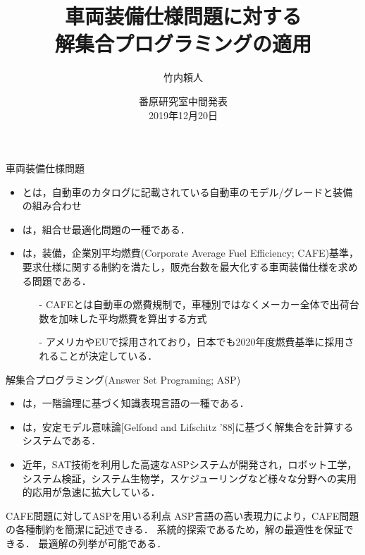 \documentclass[dvipdfmx, 11pt]{beamer}
\title{車両装備仕様問題に対する\\解集合プログラミングの適用}
\author{竹内頼人}
\institute{名古屋大学 工学部 電気電子・情報工学科 情報工学コース 4年}
\date{番原研究室中間発表\\2019年12月20日}
\begin{document}
\begin{frame} {}
 \titlepage
\end{frame}
\begin{frame}{車両装備仕様問題}
 \begin{itemize}
 \setlength{\itemsep}{10pt}
  \item {}とは，自動車のカタログに記載されている自動車のモデル/グレードと装備の組み合わせ
 
  \item {}は，組合せ最適化問題の一種である．

   \item {}は，装備，企業別平均燃費(Corporate Average Fuel Efficiency; CAFE)基準，
      要求仕様に関する制約を満たし，販売台数を最大化する車両装備仕様を求める問題である．
    \begin{itemize}
    \setlength{\itemsep}{7pt}
     \item[-] CAFEとは自動車の燃費規制で，車種別ではなくメーカー全体で出荷台数を加味した平均燃費を算出する方式
      \item[-] アメリカやEUで採用されており，日本でも2020年度燃費基準に採用されることが決定している．
     \end{itemize}
 \end{itemize}
\end{frame}
\begin{frame}{解集合プログラミング(Answer Set Programing; ASP)}
 \begin{itemize}
   \setlength{\itemsep}{10pt}
   \item {}は，一階論理に基づく知識表現言語の一種である．
   \item {}は，安定モデル意味論[Gelfond and Lifschitz '88]に基づく解集合を計算するシステムである．
   \item 近年，SAT技術を利用した高速なASPシステムが開発され，ロボット工学，システム検証，システム生物学，スケジューリングなど様々な分野への実用的応用が急速に拡大している．
 \end{itemize}
  \begin{exampleblock}{CAFE問題に対してASPを用いる利点}
 	ASP言語の高い表現力により，CAFE問題の各種制約を簡潔に記述できる．
      	系統的探索であるため，解の最適性を保証できる．
      	最適解の列挙が可能である．
 \end{exampleblock}

\end{frame}
\end{document}

